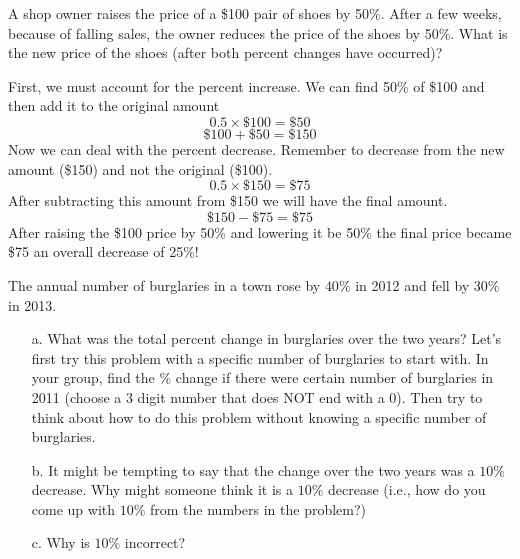 \documentclass{ximera}
\begin{document}
\begin{example}
A shop owner raises the price of a \$100 pair of shoes by 50\%. After a few weeks, because of falling sales, the owner reduces the price of the shoes by 50\%.
What is the new price of the shoes (after both percent changes have occurred)?
\begin{explanation}
  First, we must account for the percent increase. We can find 50\% of \$100 and then add it to the original amount
$$
0.5 \times \$100 = \$50
$$
$$
\$ 100 + \$50 = \$ 150
$$
Now we can deal with the percent decrease. Remember to decrease from the new amount (\$150) and not the original (\$100).
$$
0.5 \times \$150 = \$75
$$
After subtracting this amount from \$150 we will have the final amount.
$$
\$ 150 - \$75 = \$ 75
$$
After raising the \$100 price by 50\% and lowering it be 50\% the final price became \$75 an overall decrease of 25\%!
\end{explanation}
\end{example}



\begin{exploration}
The annual number of burglaries in a town rose by $40\%$ in 2012 and fell by $30\%$ in 2013.
\begin{itemize}
\item[a.] What was the total percent change in burglaries over the two years?
Let's first try this problem with a specific number of burglaries to start with.  In your group, find the $\%$ change if there were certain number of burglaries in 2011 (choose a 3 digit number that does NOT end with a 0).  Then try to think about how to do this problem without knowing a specific number of burglaries.
\item[b.] It might be tempting to say that the change over the two years was a $10\%$ decrease.  Why might someone think it is a $10\%$ decrease (i.e., how do you come up with $10\%$ from the numbers in the problem?)
\item[c.] Why is $10\%$ incorrect?
\end{itemize}
\end{exploration}
\end{document}
